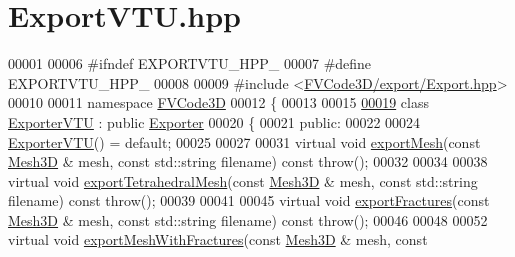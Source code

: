 \hypertarget{ExportVTU_8hpp_source}{}\section{Export\+V\+T\+U.\+hpp}
\label{ExportVTU_8hpp_source}

\begin{DoxyCode}
00001 
00006 \textcolor{preprocessor}{#ifndef EXPORTVTU\_HPP\_}
00007 \textcolor{preprocessor}{#define EXPORTVTU\_HPP\_}
00008 
00009 \textcolor{preprocessor}{#include <\hyperlink{Export_8hpp}{FVCode3D/export/Export.hpp}>}
00010 
00011 \textcolor{keyword}{namespace }\hyperlink{namespaceFVCode3D}{FVCode3D}
00012 \{
00013 
00015 
\hypertarget{ExportVTU_8hpp_source.tex_l00019}{}\hyperlink{classFVCode3D_1_1ExporterVTU}{00019} \textcolor{keyword}{class }\hyperlink{classFVCode3D_1_1ExporterVTU}{ExporterVTU} : \textcolor{keyword}{public} \hyperlink{classFVCode3D_1_1Exporter}{Exporter}
00020 \{
00021 \textcolor{keyword}{public}:
00022 
00024     \hyperlink{classFVCode3D_1_1ExporterVTU_a0e467b067b3cff3c1b563dda84794818}{ExporterVTU}() = \textcolor{keywordflow}{default};
00025 
00027 
00031     \textcolor{keyword}{virtual} \textcolor{keywordtype}{void} \hyperlink{classFVCode3D_1_1ExporterVTU_a8e5eff8e388cf6de1bf1c1deca863ac7}{exportMesh}(\textcolor{keyword}{const} \hyperlink{classFVCode3D_1_1Mesh3D}{Mesh3D} & mesh, \textcolor{keyword}{const} std::string filename) \textcolor{keyword}{const} \textcolor{keywordflow}{throw}();
00032 
00034 
00038     \textcolor{keyword}{virtual} \textcolor{keywordtype}{void} \hyperlink{classFVCode3D_1_1ExporterVTU_ac043bd93a6a079f864bc1b76a21df6a2}{exportTetrahedralMesh}(\textcolor{keyword}{const} \hyperlink{classFVCode3D_1_1Mesh3D}{Mesh3D} & mesh, \textcolor{keyword}{const} std::string 
      filename) \textcolor{keyword}{const} \textcolor{keywordflow}{throw}();
00039 
00041 
00045     \textcolor{keyword}{virtual} \textcolor{keywordtype}{void} \hyperlink{classFVCode3D_1_1ExporterVTU_abdb2e3f36907610720d698d9bfa9428d}{exportFractures}(\textcolor{keyword}{const} \hyperlink{classFVCode3D_1_1Mesh3D}{Mesh3D} & mesh, \textcolor{keyword}{const} std::string filename) \textcolor{keyword}{
      const} \textcolor{keywordflow}{throw}();
00046 
00048 
00052     \textcolor{keyword}{virtual} \textcolor{keywordtype}{void} \hyperlink{classFVCode3D_1_1ExporterVTU_a5af587a4d971f4d41caecbef3477211b}{exportMeshWithFractures}(\textcolor{keyword}{const} \hyperlink{classFVCode3D_1_1Mesh3D}{Mesh3D} & mesh, \textcolor{keyword}{const} 

\end{DoxyCode}
